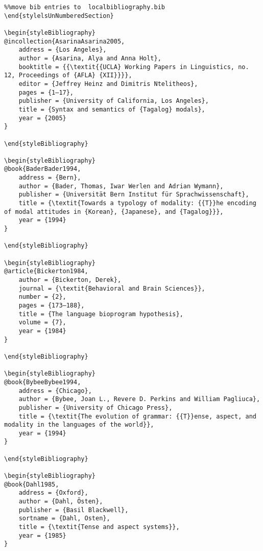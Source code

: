 \begin{stylelsUnNumberedSection}
\begin{verbatim}%%move bib entries to  localbibliography.bib
\end{stylelsUnNumberedSection}

\begin{styleBibliography}
@incollection{AsarinaAsarina2005,
	address = {Los Angeles},
	author = {Asarina, Alya and Anna Holt},
	booktitle = {{\textit{{UCLA} Working Papers in Linguistics, no. 12, Proceedings of {AFLA} {XII}}}},
	editor = {Jeffrey Heinz and Dimitris Ntelitheos},
	pages = {1–17},
	publisher = {University of California, Los Angeles},
	title = {Syntax and semantics of {Tagalog} modals},
	year = {2005}
}

\end{styleBibliography}

\begin{styleBibliography}
@book{BaderBader1994,
	address = {Bern},
	author = {Bader, Thomas, Iwar Werlen and Adrian Wymann},
	publisher = {Universität Bern Institut für Sprachwissenschaft},
	title = {\textit{Towards a typology of modality: {{T}}he encoding of modal attitudes in {Korean}, {Japanese}, and {Tagalog}}},
	year = {1994}
}

\end{styleBibliography}

\begin{styleBibliography}
@article{Bickerton1984,
	author = {Bickerton, Derek},
	journal = {\textit{Behavioral and Brain Sciences}},
	number = {2},
	pages = {173–188},
	title = {The language bioprogram hypothesis},
	volume = {7},
	year = {1984}
}

\end{styleBibliography}

\begin{styleBibliography}
@book{BybeeBybee1994,
	address = {Chicago},
	author = {Bybee, Joan L., Revere D. Perkins and William Pagliuca},
	publisher = {University of Chicago Press},
	title = {\textit{The evolution of grammar: {{T}}ense, aspect, and modality in the languages of the world}},
	year = {1994}
}

\end{styleBibliography}

\begin{styleBibliography}
@book{Dahl1985,
	address = {Oxford},
	author = {Dahl, Östen},
	publisher = {Basil Blackwell},
	sortname = {Dahl, Osten},
	title = {\textit{Tense and aspect systems}},
	year = {1985}
}


\end{verbatim}
\end{stylelsUnNumberedSection}
